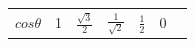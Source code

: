 {\begin{center}
\begin{xtabular*}{\mytablewidth}[t]{|p{10\mystarwidth}|p{10\mystarwidth}|p{10\mystarwidth}|p{10\mystarwidth}|p{10\mystarwidth}|p{10\mystarwidth}|p{10\mystarwidth}|}
    
        
                  \begin{math}cos\theta \end{math}
                 &
    
    
        1 &
    
    
        
                  \begin{math}\frac{\sqrt{3}}{2}\end{math}
                 &
    
    
        
                  \begin{math}\frac{1}{\sqrt{2}}\end{math}
                 &
    
    
        
                  \begin{math}\frac{1}{2}\end{math}
                 &
    
    
        0 &
    
    
        

\end{xtabular*}
\end{center}}
